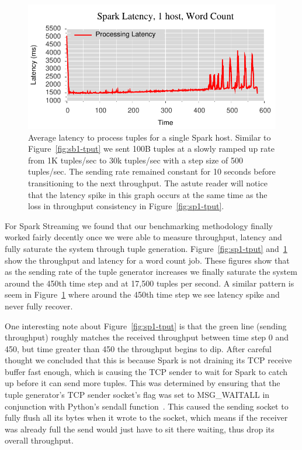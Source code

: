 \begin{figure}[t]
\centering
\includegraphics[width=1\linewidth]{figures/sp1_latency.pdf}
\caption{Average latency to process tuples for a single Spark host. Similar to
Figure~\ref{fig:sb1-tput} we sent 100B tuples at a slowly ramped up rate from 1K
tuples/sec to 30k tuples/sec with a step size of 500 tuples/sec. The sending
rate remained constant for 10 seconds before transitioning to the next
throughput. The astute reader will notice that the latency spike in this graph
occurs at the same time as the loss in throughput consistency in
Figure~\ref{fig:sp1-tput}.}
\label{fig:sp1-latency}
\end{figure}

For Spark Streaming we found that our benchmarking methodology finally worked
fairly decently once we were able to measure throughput, latency and fully
saturate the system through tuple generation. Figure~\ref{fig:sp1-tput}
and~\ref{fig:sp1-latency} show the throughput and latency for a word count job. These
figures show that as the sending rate of the tuple generator increases we
finally saturate the system around the 450th time step and at 17,500 tuples per
second. A similar pattern is seem in Figure~\ref{fig:sp1-latency} where around
the 450th time step we see latency spike and never fully recover. 

One interesting note about Figure~\ref{fig:sp1-tput} is that the green line
(sending throughput) roughly matches the received throughput between time step
0 and 450, but time greater than 450 the throughput begins to dip. After
careful thought we concluded that this is because Spark is not draining its TCP
receive buffer fast enough, which is causing the TCP sender to wait for Spark
to catch up before it can send more tuples. This was determined by ensuring
that the tuple generator's TCP sender socket's flag was set to MSG\_WAITALL in
conjunction with Python's sendall function~\cite{python-sockets}. This caused
the sending socket to fully flush all its bytes when it wrote to the socket,
which means if the receiver was already full the send would just have to sit
there waiting, thus drop its overall throughput.


